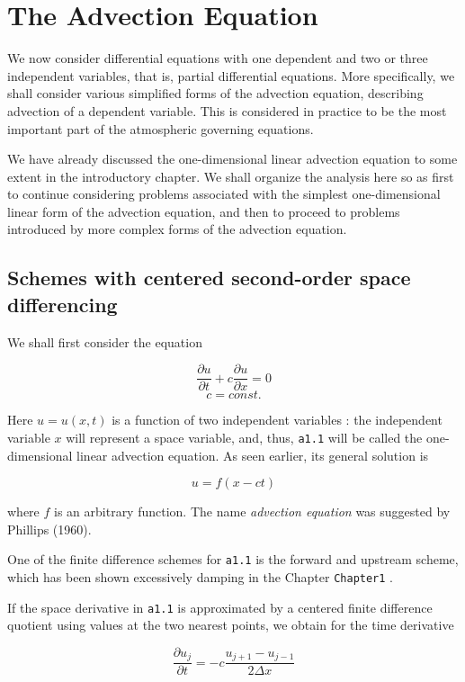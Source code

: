 \chapter{The Advection Equation}\label{ch:advection-equation}

We now consider differential equations with one dependent and two or
three independent variables, that is, partial differential equations.
More specifically, we shall consider various simplified forms of the
advection equation, describing advection of a dependent variable. This
is considered in practice to be the most important part of the
atmospheric governing equations.

We have already discussed the one-dimensional linear advection equation
to some extent in the introductory chapter. We shall organize the
analysis here so as first to continue considering problems associated
with the simplest one-dimensional linear form of the advection equation,
and then to proceed to problems introduced by more complex forms of the
advection equation.

\section{Schemes with centered second-order space differencing}\label{sec:schemes-centered-second-order-space-diff}

We shall first consider the equation

 \[\frac{\partial u}{\partial t}  +c\frac{\partial u}{\partial x} = 0\]\[c = const.\]

Here \(u = u\left( x,t \right)\) is a function of two independent
variables : the independent variable \(x\) will represent a space
variable, and, thus, \texttt{a1.1} will be called the one-dimensional
linear advection equation. As seen earlier, its general solution is

 \[u = f\left( x - ct \right)\]

where \(f\) is an arbitrary function. The name \emph{advection equation}
was suggested by Phillips (1960).

One of the finite difference schemes for \texttt{a1.1} is the forward
and upstream scheme, which has been shown excessively damping in the
Chapter \texttt{Chapter1} .

If the space derivative in \texttt{a1.1} is approximated by a centered
finite difference quotient using values at the two nearest points, we
obtain for the time derivative

 \[\frac{\partial u_{j}}{\partial t} = - c\frac{u_{j + 1} - u_{j - 1}}{2\Delta x}\]


